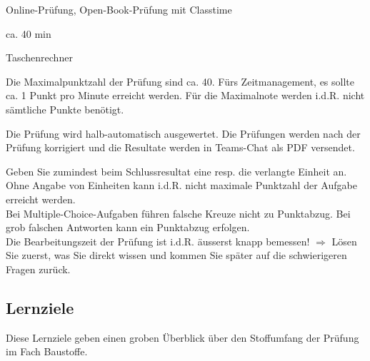 \begin{description}[leftmargin=!,labelwidth=\widthof{Hinweise zur Bearbeitung...},font=\normalfont]
\item [Prüfungsmodus] Online-Prüfung, Open-Book-Prüfung mit Classtime
\item  [Prüfungsdauer] ca. 40 min
\item [Empfohlene Hilfsmittel] Taschenrechner
\item [Anzahl Punkte] Die Maximalpunktzahl der Prüfung sind ca. 40.  Fürs Zeitmanagement, es sollte ca. 1 Punkt pro Minute erreicht werden. Für die Maximalnote werden i.d.R. nicht sämtliche Punkte benötigt.
\item [Bewertung] Die Prüfung wird halb-automatisch ausgewertet. Die Prüfungen werden nach der Prüfung korrigiert und die Resultate werden in Teams-Chat als PDF versendet.
\item [Hinweise zur Bearbeitung] Geben Sie zumindest beim Schlussresultat eine resp. die verlangte Einheit an. Ohne Angabe von Einheiten kann i.d.R. nicht maximale Punktzahl der Aufgabe erreicht werden. \\ Bei Multiple-Choice-Aufgaben führen falsche Kreuze nicht zu Punktabzug. Bei grob falschen Antworten kann ein Punktabzug erfolgen. \\ Die Bearbeitungszeit der Prüfung ist i.d.R. äusserst knapp bemessen! $\Rightarrow$ Lösen Sie zuerst, was Sie direkt wissen und kommen Sie später auf die schwierigeren Fragen zurück.
\end{description}


\pagebreak

\subsection*{Lernziele}
Diese Lernziele geben einen groben Überblick über den Stoffumfang der \nrPruefung\xspace Prüfung im Fach Baustoffe.





%
%
%
%






